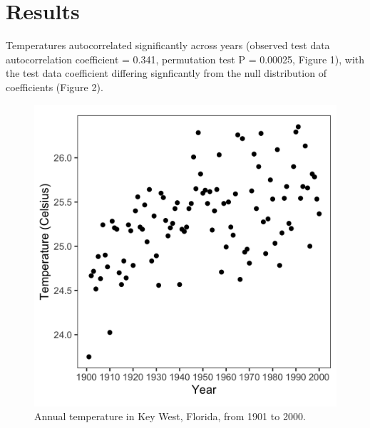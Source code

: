 \documentclass{article}
\begin{document}
\section{Results \vspace{-0.5em}}

Temperatures autocorrelated significantly across years (observed test data autocorrelation coefficient = 0.341, permutation test P = 0.00025, Figure 1), with the test data coefficient differing signficantly from the null distribution of coefficients (Figure 2). \vspace{-0.5em}

    \begin{figure}[htbp]
    \centering
    \begin{minipage}{.5\textwidth}
        \centering
        \includegraphics[scale=0.2]{DistributionFlorida.png}
        \caption{Annual temperature in Key West, Florida, \newline from 1901 to 2000.} 
        \label{fig.test1}
    \end{minipage}%
    \begin{minipage}{.5\textwidth}
        \centering

\end{minipage}
\end{figure}
\end{document}
